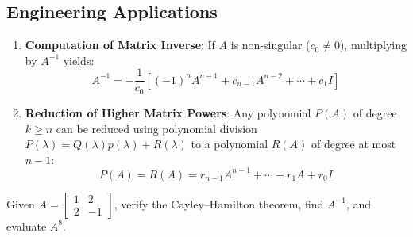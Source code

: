 \subsection{Engineering Applications}
\begin{enumerate}[leftmargin=1.5em]
    \item \textbf{Computation of Matrix Inverse}: If $A$ is non-singular ($c_0 \ne 0$), multiplying by $A^{-1}$ yields:
    \begin{equation}
    A^{-1} = -\frac{1}{c_0} \left[ (-1)^n A^{n-1} + c_{n-1} A^{n-2} + \cdots + c_1 I \right]
    \end{equation}
    \item \textbf{Reduction of Higher Matrix Powers}: Any polynomial $P(A)$ of degree $k \ge n$ can be reduced using polynomial division $P(\lambda) = Q(\lambda)p(\lambda) + R(\lambda)$ to a polynomial $R(A)$ of degree at most $n-1$:
    \begin{equation}
    P(A) = R(A) = r_{n-1} A^{n-1} + \cdots + r_1 A + r_0 I
    \end{equation}
\end{enumerate}

\begin{example}
Given $A = \begin{bmatrix} 1 & 2 \\ 2 & -1 \end{bmatrix}$, verify the Cayley--Hamilton theorem, find $A^{-1}$, and evaluate $A^8$.
\end{example}


